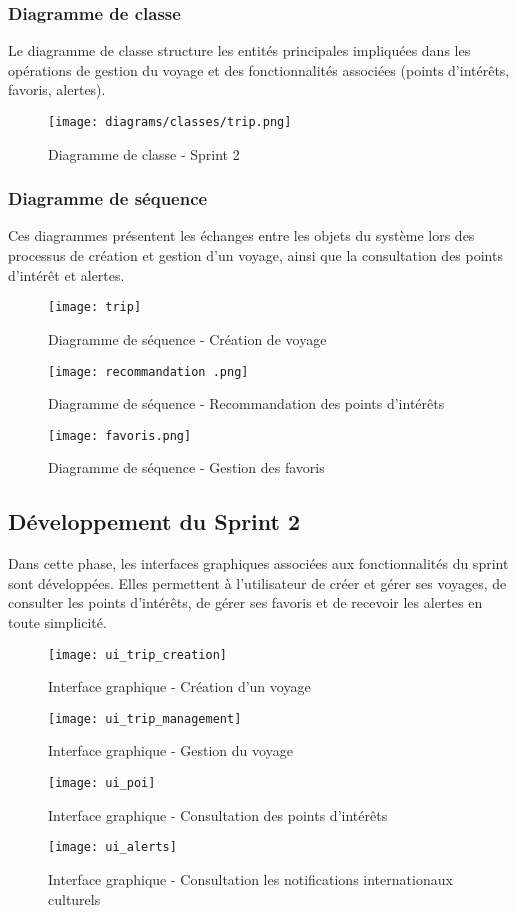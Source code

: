 \subsubsection{Diagramme de classe}

Le diagramme de classe structure les entités principales impliquées dans les opérations de gestion du voyage 
et des fonctionnalités associées (points d’intérêts, favoris, alertes).

\begin{figure}[H]
    \centering
    \texttt{[image: diagrams/classes/trip.png]}
    \caption{Diagramme de classe - Sprint 2}
\end{figure}

\subsubsection{Diagramme de séquence}

Ces diagrammes présentent les échanges entre les objets du système lors des processus de création et gestion d’un voyage, 
ainsi que la consultation des points d’intérêt et alertes.

\begin{figure}[H]
    \centering
    \texttt{[image: trip]}
    \caption{Diagramme de séquence - Création de voyage}
    
    \centering
    \texttt{[image: recommandation .png]}
    \caption{Diagramme de séquence - Recommandation des points d'intérêts }
    
    \centering
    \texttt{[image: favoris.png]}
    \caption{Diagramme de séquence - Gestion des favoris}
\end{figure}

\subsection{Développement du Sprint 2}

Dans cette phase, les interfaces graphiques associées aux fonctionnalités du sprint sont développées. 
Elles permettent à l’utilisateur de créer et gérer ses voyages, de consulter les points d’intérêts, de gérer ses favoris 
et de recevoir les alertes en toute simplicité.

\begin{figure}[H]
    \centering
    \texttt{[image: ui\_trip\_creation]}
    \caption{Interface graphique - Création d’un voyage}
    
    \centering  
    \texttt{[image: ui\_trip\_management]}
    \caption{Interface graphique - Gestion du voyage}
    
    \centering
    \texttt{[image: ui\_poi]}
    \caption{Interface graphique - Consultation des points d’intérêts}
    
    \centering
    \texttt{[image: ui\_alerts]}
    \caption{Interface graphique - Consultation les notifications internationaux culturels}
\end{figure}

